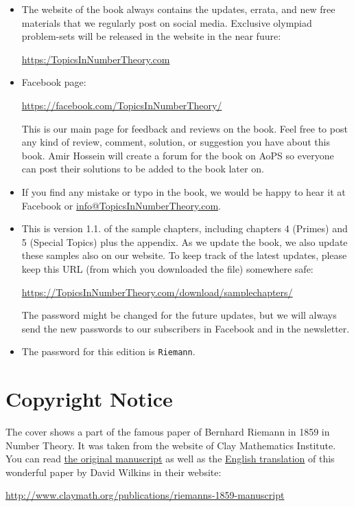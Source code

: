 \documentclass[leqno, 12pt]{book}
\begin{document}
\begin{itemize}
	\item The website of the book always contains the updates, errata, and new free materials that we regularly post on social media. Exclusive olympiad problem-sets will be released in the website in the near fuure: \begin{center}
		\url{https:/TopicsInNumberTheory.com}
	\end{center}

	\item Facebook page:
		\begin{center}
			\url{https://facebook.com/TopicsInNumberTheory/}
		\end{center}
	This is our main page for feedback and reviews on the book. Feel free to post any kind of review, comment, solution, or suggestion you have about this book. Amir Hossein will create a forum for the book on AoPS so everyone can post their solutions to be added to the book later on.
	\item If you find any mistake or typo in the book, we would be happy to hear it at Facebook or \href{mailto:info@TopicsInNumberTheory.com}{info@TopicsInNumberTheory.com}.
	
	\item This is version 1.1. of the sample chapters, including chapters 4 (Primes) and 5 (Special Topics) plus the appendix. As we update the book, we also update these samples also on our website. To keep track of the latest updates, please keep this URL (from which you downloaded the file) somewhere safe:
		\begin{center}
			\url{https://TopicsInNumberTheory.com/download/samplechapters/}
		\end{center}
	The password might be changed for the future updates, but we will always send the new passwords to our subscribers in Facebook and in the newsletter.
	\item The password for this edition is \texttt{Riemann}.
\end{itemize}

\section*{Copyright Notice}
The cover shows a part of the famous paper of Bernhard Riemann in 1859 in Number Theory. It was taken from the website of Clay Mathematics Institute. You can read \href{http://www.claymath.org/sites/default/files/riemann1859.pdf}{the original manuscript} as well as the \href{http://www.claymath.org/sites/default/files/ezeta.pdf}{English translation} of this wonderful paper by David Wilkins in their website:
	\begin{center}
			\url{http://www.claymath.org/publications/riemanns-1859-manuscript}
	\end{center}
\end{document}
